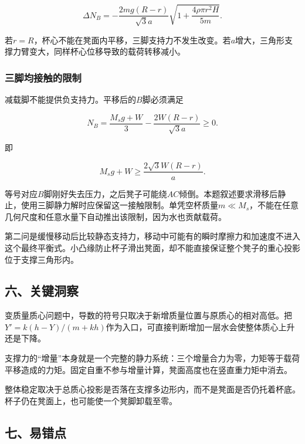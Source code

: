 \documentclass[12pt,a4paper,fontset=fandol]{ctexart}
\begin{document}
\[
\boxed{\Delta N_B=
-\frac{2mg(R-r)}{\sqrt3a}
\sqrt{1+\frac{4\rho\pi r^2H}{5m}}}.
\]

若\(r=R\)，杯心不能在凳面内平移，三脚支持力不发生改变。若\(a\)增大，三角形支撑力臂变大，同样杯心位移导致的载荷转移减小。

\par\noindent\begin{minipage}{\linewidth}
\subsubsection{三脚均接触的限制}\label{ux4e09ux811aux5747ux63a5ux89e6ux7684ux9650ux5236}

减载脚不能提供负支持力。平移后的\(B\)脚必须满足

\[
N_B=\frac{M_sg+W}{3}
-\frac{2W(R-r)}{\sqrt3a}\ge0.
\]

即

\[
\boxed{
M_sg+W\ge \frac{2\sqrt3W(R-r)}a}.
\]

等号对应\(B\)脚刚好失去压力，之后凳子可能绕\(AC\)倾倒。本题叙述要求滑移后静止，使用三脚静力解时应保留这一接触限制。单凭空杯质量\(m\ll M_s\)，不能在任意几何尺度和任意水量下自动推出该限制，因为水也贡献载荷。

第二问是缓慢移动后比较静态支持力，移动中可能有的瞬时摩擦力和加速度不进入这个最终平衡式。小凸缘防止杯子滑出凳面，却不能直接保证整个凳子的重心投影位于支撑三角形内。

\end{minipage}\par
\subsection{六、关键洞察}\label{ux516dux5173ux952eux6d1eux5bdf}

变质量质心问题中，导数的符号只取决于新增质量位置与原质心的相对高低。把\(Y'=k(h-Y)/(m+kh)\)作为入口，可直接判断增加一层水会使整体质心上升还是下降。

支撑力的``增量''本身就是一个完整的静力系统：三个增量合力为零，力矩等于载荷平移造成的力矩。固定自重不参与增量计算，凳面高度也在竖直重力矩中消去。

整体稳定取决于总质心投影是否落在支撑多边形内，而不是凳面是否仍托着杯底。杯子仍在凳面上，也可能使一个凳脚卸载至零。

\subsection{七、易错点}\label{ux4e03ux6613ux9519ux70b9}
\end{document}
